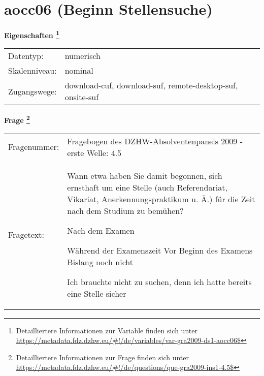 
    \setcounter{footnote}{0}

    \vspace*{-1.8cm}
	\section{aocc06 (Beginn Stellensuche)}
	\label{section:aocc06}



    \vspace*{0.5cm}
    \noindent\textbf{Eigenschaften
	\footnote{Detailliertere Informationen zur Variable finden sich unter
		\url{https://metadata.fdz.dzhw.eu/\#!/de/variables/var-gra2009-ds1-aocc06$}}}\\
	\begin{tabularx}{\hsize}{@{}lX}
	Datentyp: & numerisch \\
	Skalenniveau: & nominal \\
	Zugangswege: &
	  download-cuf, 
	  download-suf, 
	  remote-desktop-suf, 
	  onsite-suf
 \\
    \end{tabularx}



				\vspace*{0.5cm}
                \noindent\textbf{Frage
	                \footnote{Detailliertere Informationen zur Frage finden sich unter
		              \url{https://metadata.fdz.dzhw.eu/\#!/de/questions/que-gra2009-ins1-4.5$}}}\\
				\begin{tabularx}{\hsize}{@{}lX}
					Fragenummer: &
					  Fragebogen des DZHW-Absolventenpanels 2009 - erste Welle:
					  4.5
 \\
					Fragetext: & Wann etwa haben Sie damit begonnen, sich ernsthaft um eine Stelle (auch Referendariat, Vikariat, Anerkennungspraktikum u. Ä.) für die Zeit nach dem Studium zu bemühen?\par  Nach dem Examen\par  Während der Examenszeit Vor Beginn des Examens Bislang noch nicht\par  Ich brauchte nicht zu suchen, denn ich hatte bereits eine Stelle sicher \\
				\end{tabularx}





